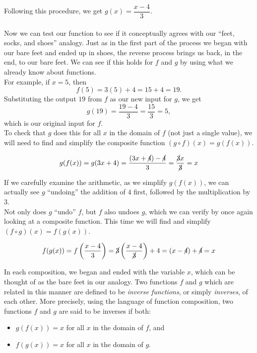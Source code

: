 \documentclass[11pt]{book}
\theoremstyle{definition}  %
\begin{document}
Following this procedure, we get $g(x) = \dfrac{x-4}{3}$.\\
~\\
Now we can test our function to see if it conceptually agrees with our ``feet, socks, and shoes'' analogy.  Just as in the first part of the process we began with our bare feet and ended up in shoes, the reverse process brings us back, in the end, to our bare feet.  We can see if this holds for $f$ and $g$ by using what we already know about functions.\\

For example, if $x=5$, then $$f(5) = 3(5)+4 = 15+4 = 19.$$
Substituting the output $19$ from $f$ as our new input for $g$, we get $$g(19) = \dfrac{19-4}{3} = \dfrac{15}{3} = 5,$$
which is our original input for $f$.\\

To check that $g$ does this for all $x$ in the domain of $f$ (not just a single value), we will need to find and simplify the composite function $(g\circ f)(x)=g(f(x))$.

$$g(f(x)) = g(3x+4) = \dfrac{(3x+\cancel{4})-\cancel{4}}{3} = \dfrac{\cancel{3}x}{\cancel{3}} = x$$

If we carefully examine the arithmetic, as we simplify $g(f(x))$, we can actually see $g$ ``undoing'' the addition of $4$ first, followed by the multiplication by $3$.\\

Not only does $g$ ``undo'' $f$, but $f$ also undoes $g$, which we can verify by once again looking at a composite function.  This time we will find and simplify $(f\circ g)(x)=f(g(x))$.

$$f(g(x)) = f\left(\dfrac{x-4}{3}\right) = \cancel{3} \left(\dfrac{x-4}{\cancel{3}}\right) + 4 = (x-\cancel{4}) + \cancel{4} = x$$

In each composition, we began and ended with the variable $x$, which can be thought of as the bare feet in our analogy.  Two functions $f$ and $g$ which are related in this manner are defined to be \textit{inverse functions}, or simply \textit{inverses}, of each other.  More precisely, using the language of function composition, two functions $f$ and $g$ are said to be inverses if both:

\begin{itemize}
	\item $g(f(x)) = x$ for all $x$ in the domain of $f$, and 
	\item $f(g(x)) = x$ for all $x$ in the domain of $g$.
\end{itemize}
\end{document}
